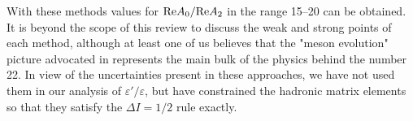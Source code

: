 With these methods values for ${\rm
Re}A_0/{\rm Re}A_2$ in the range 15--20 can be obtained. It is beyond
the scope of this review to discuss the weak and strong points of each
method, although at least one of us believes that the "meson evolution"
picture advocated in \cite{bardeen:87b} represents the main bulk of the
physics behind the number 22.  In view of the uncertainties present in
these approaches, we have not used them in our analysis of
$\varepsilon'/\varepsilon$, but have constrained the hadronic matrix
elements so that they satisfy the $\Delta I=1/2$ rule exactly.
